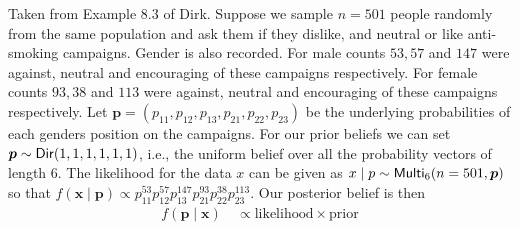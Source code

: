 \begin{exam}
    Taken from Example 8.3 of Dirk. Suppose we sample $n=501$ people randomly from the same population and ask them if they dislike, and neutral or like anti-smoking campaigns. Gender is also recorded. For male counts $53,57$ and $147$ were against, neutral and encouraging of these campaigns respectively. For female counts $93,38$ and $113$ were against, neutral and encouraging of these campaigns respectively. Let $\bm{p} = \left( p_{11} , p_{12}, p_{13} , p_{21} , p_{22}, p_{23}  \right)$ be the underlying probabilities of each genders position on the campaigns. For our prior beliefs we can set $\bm{p} \sim {\sf Dir} (1,1,1,1,1,1)$, i.e., the uniform belief over all the probability vectors of length $6$. The likelihood for the data $x$ can be given as $x \mid p \sim {\sf Multi}_6 (n=501,\bm{p})$ so that $f(\bm{x} \mid \bm{p}) \propto p_{11}^{53} p_{12}^{57} p_{13}^{147} p_{21}^{93} p_{22}^{38} p_{23}^{113}$. Our posterior belief is then
    \begin{align*}
        f (\bm{p} \mid \bm{x}) \
         & \propto \text{likelihood} \times \text{prior}
    \end{align*}
\end{exam}